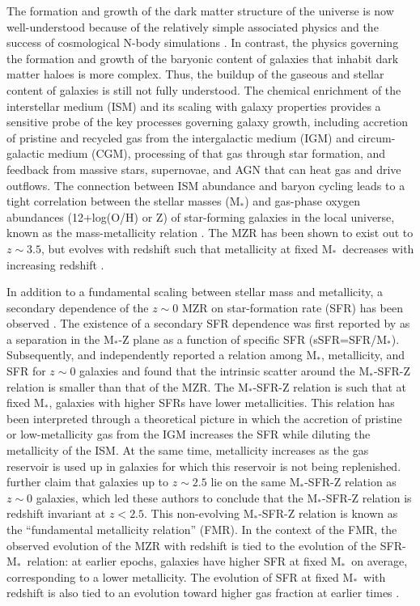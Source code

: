 \documentclass[iop,twocolappendix]{emulateapj}
\newcommand{\mstar}{$\mbox{M}_*$}
\begin{document}
The formation and growth of the dark matter structure of the universe is now well-understood
 because of the relatively simple associated physics and the success of cosmological N-body
 simulations \citep[e.g.,][]{spr05}.
  In contrast, the physics governing the formation and growth of the baryonic content of galaxies
 that inhabit dark matter haloes is more complex.  Thus, the buildup of the gaseous and stellar
 content of galaxies is still not fully understood.
  The chemical enrichment of the interstellar medium (ISM) and its scaling with galaxy properties provides
 a sensitive probe of the key processes governing galaxy growth, including accretion of pristine and
 recycled gas from the intergalactic medium (IGM) and circum-galactic medium (CGM),
 processing of that gas through star formation, and
 feedback from massive stars, supernovae, and AGN that can heat gas and drive outflows.
  The connection between ISM abundance and baryon cycling leads to a
 tight correlation between the stellar masses (\mstar) and
 gas-phase oxygen abundances (12+log(O/H) or Z) of star-forming galaxies
 in the local universe, known as the mass-metallicity relation \citep[MZR; e.g.,][]{tre04,kew08,and13}.
  The MZR has been shown to exist out to $z\sim3.5$, but evolves with redshift such that metallicity at
 fixed \mstar\ decreases with increasing redshift \citep[e.g.,][]{erb06,mai08,tro14,san15,ono16}.

In addition to a fundamental scaling between stellar mass and metallicity, a secondary dependence
 of the $z\sim0$ MZR on star-formation rate (SFR) has been observed \citep[e.g.,][]{ell08,man10,lar10,yat12,and13}.
  The existence of a secondary SFR dependence was first reported by
 \citet{ell08} as a separation in the \mstar-Z plane as a function of specific SFR (sSFR=SFR/\mstar).
  Subsequently, \citet{man10} and \citet{lar10} independently reported a relation among \mstar, metallicity, and SFR
 for $z\sim0$ galaxies and found that the intrinsic scatter around the \mstar-SFR-Z relation is smaller
 than that of the MZR.
  The \mstar-SFR-Z relation is such that at fixed \mstar, galaxies with higher SFRs have lower
 metallicities.  This relation has been interpreted through a theoretical picture
 in which the accretion of pristine or low-metallicity gas from the IGM increases the SFR while
 diluting the metallicity of the ISM.
  At the same time, metallicity increases as the gas reservoir is used
 up in galaxies for which this reservoir is not being replenished.
  \citet{man10} further claim that galaxies up to $z\sim2.5$ lie on the same
 \mstar-SFR-Z relation as $z\sim0$ galaxies, which led these authors to conclude that the
 \mstar-SFR-Z relation is redshift invariant at $z<2.5$.  This non-evolving \mstar-SFR-Z relation
 is known as the ``fundamental metallicity relation'' (FMR).  In the context of the FMR,
 the observed evolution of the MZR with redshift is tied to the evolution of the
 SFR-\mstar\ relation: at earlier epochs, galaxies have higher SFR at fixed \mstar\ on average,
 corresponding to a lower metallicity.  The evolution of SFR at fixed \mstar\ with redshift
 is also tied to an evolution toward higher gas fraction at earlier times \citep{red12,tac13}.
\end{document}
